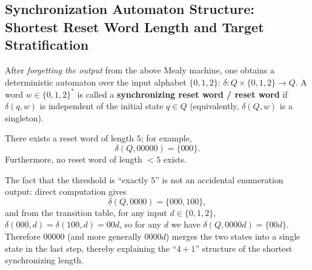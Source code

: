 \subsection{Synchronization Automaton Structure: Shortest Reset Word Length and Target Stratification}\label{app:sync-kernel-reset-automaton}
After \emph{forgetting the output} from the above Mealy machine, one obtains a deterministic automaton over the input alphabet $\{0,1,2\}$:
\(
\delta:Q\times\{0,1,2\}\to Q
\).
A word $w\in\{0,1,2\}^\ast$ is called a \textbf{synchronizing reset word / reset word} if $\delta(q,w)$ is independent of the initial state $q\in Q$ (equivalently, $\delta(Q,w)$ is a singleton).

\begin{proposition}\label{prop:sync10-reset-length-5}
There exists a reset word of length $5$; for example,
\[
\delta(Q,00000)=\{000\}.
\]
Furthermore, no reset word of length $<5$ exists.
\end{proposition}

\begin{remark}\label{rem:sync10-reset-mechanism}
The fact that the threshold is ``exactly $5$'' is not an accidental enumeration output: direct computation gives
\[
\delta(Q,0000)=\{000,100\},
\]
and from the transition table, for any input $d\in\{0,1,2\}$,
\(
\delta(000,d)=\delta(100,d)=00d
\),
so for any $d$ we have
\(
\delta(Q,0000d)=\{00d\}
\).
Therefore $00000$ (and more generally $0000d$) merges the two states into a single state in the last step, thereby explaining the ``$4+1$'' structure of the shortest synchronizing length.
\end{remark}

